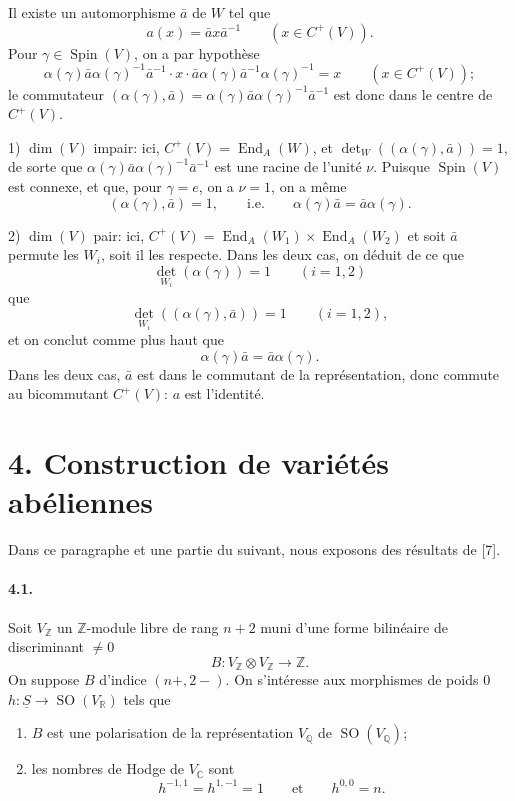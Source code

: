 \documentclass[10pt]{article}
\newcommand{\C}{\mathbb{C}}
\newcommand{\Q}{\mathbb{Q}}
\newcommand{\R}{\mathbb{R}}
\newcommand{\Z}{\mathbb{Z}}
\newcommand{\End}{\operatorname{End}}
\newcommand{\SO}{\operatorname{SO}}
\newcommand{\Spin}{\operatorname{Spin}}
\begin{document}
Il existe un automorphisme $\bar a$ de $W$ tel que
\[
a(x)=\bar a x\bar a^{-1}\qquad(x\in C^+(V)).
\]
Pour $\gamma\in\Spin(V)$, on a par hypothèse
\[
\alpha(\gamma)\bar a\alpha(\gamma)^{-1}\bar a^{-1}\cdot x\cdot \bar a\alpha(\gamma)\bar a^{-1}\alpha(\gamma)^{-1}=x\qquad(x\in C^+(V));
\]
le commutateur $(\alpha(\gamma),\bar a)=\alpha(\gamma)\bar a\alpha(\gamma)^{-1}\bar a^{-1}$ est donc dans le centre de $C^+(V)$.

1) $\dim(V)$ impair: ici, $C^+(V)=\End_A(W)$, et $\det_W((\alpha(\gamma),\bar a))=1$, de sorte que $\alpha(\gamma)\bar a\alpha(\gamma)^{-1}\bar a^{-1}$ est une racine de l'unité $\nu$. Puisque $\Spin(V)$ est connexe, et que, pour $\gamma=e$, on a $\nu=1$, on a même
\[
(\alpha(\gamma),\bar a)=1,
\qquad\text{i.e.}\qquad
\alpha(\gamma)\bar a=\bar a\alpha(\gamma).
\]

2) $\dim(V)$ pair: ici, $C^+(V)=\End_A(W_1)\times\End_A(W_2)$ et soit $\bar a$ permute les $W_i$, soit il les respecte. Dans les deux cas, on déduit de ce que
\[
\det_{W_i}(\alpha(\gamma))=1\qquad(i=1,2)
\]
que
\[
\det_{W_i}((\alpha(\gamma),\bar a))=1\qquad(i=1,2),
\]
et on conclut comme plus haut que
\[
\alpha(\gamma)\bar a=\bar a\alpha(\gamma).
\]
Dans les deux cas, $\bar a$ est dans le commutant de la représentation, donc commute au bicommutant $C^+(V)$: $a$ est l'identité.

\section*{4. Construction de variétés abéliennes}

Dans ce paragraphe et une partie du suivant, nous exposons des résultats de [7].

\paragraph{4.1.} Soit $V_\Z$ un $\Z$-module libre de rang $n+2$ muni d'une forme bilinéaire de discriminant $\ne0$
\[
B:V_\Z\otimes V_\Z\longrightarrow\Z.
\]
On suppose $B$ d'indice $(n+,2-)$. On s'intéresse aux morphismes de poids $0$ $h:\underline S\to\SO(V_\R)$ tels que
\begin{enumerate}[label=\arabic*)]
\item $B$ est une polarisation de la représentation $V_\Q$ de $\SO(V_\Q)$;
\item les nombres de Hodge de $V_\C$ sont
\[
h^{-1,1}=h^{1,-1}=1\qquad\text{et}\qquad h^{0,0}=n.
\]
\end{enumerate}
\end{document}
